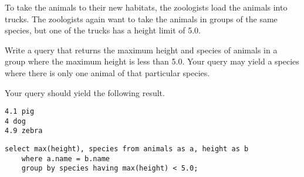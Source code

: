 \begin{blocksection}
\question To take the animals to their new habitats, the zoologists load the animals into trucks.  The zoologists again want to take the animals in groups of the same species, but one of the trucks has a height limit of 5.0.
 
Write a query that returns the maximum height and species of animals in a group where the maximum height is less than 5.0.  Your query may yield a species where there is only one animal of that particular species.

Your query should yield the following result.

\begin{lstlisting}
4.1 pig
4 dog
4.9 zebra
\end{lstlisting}

\begin{solution}[1in]
\begin{lstlisting}
select max(height), species from animals as a, height as b
    where a.name = b.name
    group by species having max(height) < 5.0;
\end{lstlisting}
\end{solution}
\end{blocksection}
